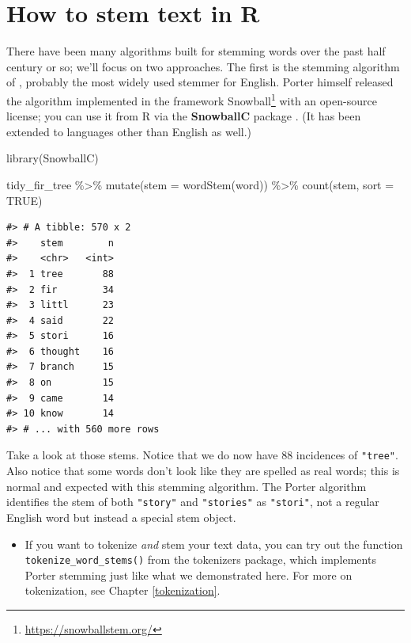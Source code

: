 \documentclass[
]{krantz}
\makeatletter
\newenvironment{Shaded}{\begin{snugshade}}{\end{snugshade}}
\newcommand{\AttributeTok}[1]{\textcolor[rgb]{0.77,0.63,0.00}{#1}}
\newcommand{\ConstantTok}[1]{\textcolor[rgb]{0.00,0.00,0.00}{#1}}
\newcommand{\FunctionTok}[1]{\textcolor[rgb]{0.00,0.00,0.00}{#1}}
\newcommand{\NormalTok}[1]{#1}
\newcommand{\SpecialCharTok}[1]{\textcolor[rgb]{0.00,0.00,0.00}{#1}}
\DeclareRobustCommand{\href}[2]{#2\footnote{\url{#1}}}
\renewcommand{\href}[2]{#2\footnote{\url{#1}}}
\newenvironment{kframe}{%
\medskip{}
\setlength{\fboxsep}{.8em}
 \def\at@end@of@kframe{}%
 \ifinner\ifhmode%
  \def\at@end@of@kframe{\end{minipage}}%
  \begin{minipage}{\columnwidth}%
 \fi\fi%
 \def\FrameCommand##1{\hskip\@totalleftmargin \hskip-\fboxsep
 \colorbox{shadecolor}{##1}\hskip-\fboxsep
     \hskip-\linewidth \hskip-\@totalleftmargin \hskip\columnwidth}%
 \MakeFramed {\advance\hsize-\width
   \@totalleftmargin\z@ \linewidth\hsize
   \@setminipage}}%
 {\par\unskip\endMakeFramed%
 \at@end@of@kframe}
\renewenvironment{Shaded}{\begin{kframe}}{\end{kframe}}
\newenvironment{rmdblock}[1]
  {\begin{shaded*}
  \begin{itemize}[left = -1cm, labelsep = 1cm]
  \renewcommand{\labelitemi}{
    \raisebox{-.7\height}[0pt][0pt]{
      {\setkeys{Gin}{width=3em,keepaspectratio}\texttt{[image: images/\#1]}}
    }
  }
 
  \item
  }
  {
  \end{itemize}
  \end{shaded*}
  }
\newenvironment{rmdnote}
  {\begin{rmdblock}{note}}
  {\end{rmdblock}}
\makeatother
\begin{document}
\hypertarget{how-to-stem-text-in-r}{%
\section{How to stem text in R}\label{how-to-stem-text-in-r}}

There have been many algorithms built for stemming words over the past half century or so; we'll focus on two approaches. The first is the stemming algorithm of \citet{Porter80}, probably the most widely used stemmer for English. Porter himself released the algorithm implemented in the framework \href{https://snowballstem.org/}{Snowball} with an open-source license; you can use it from R via the \textbf{SnowballC} package \citep{R-SnowballC}. (It has been extended to languages other than English as well.)

\begin{Shaded}
\begin{Highlighting}[]
\FunctionTok{library}\NormalTok{(SnowballC)}

\NormalTok{tidy\_fir\_tree }\SpecialCharTok{\%\textgreater{}\%}
  \FunctionTok{mutate}\NormalTok{(}\AttributeTok{stem =} \FunctionTok{wordStem}\NormalTok{(word)) }\SpecialCharTok{\%\textgreater{}\%}
  \FunctionTok{count}\NormalTok{(stem, }\AttributeTok{sort =} \ConstantTok{TRUE}\NormalTok{)}
\end{Highlighting}
\end{Shaded}

\begin{verbatim}
#> # A tibble: 570 x 2
#>    stem        n
#>    <chr>   <int>
#>  1 tree       88
#>  2 fir        34
#>  3 littl      23
#>  4 said       22
#>  5 stori      16
#>  6 thought    16
#>  7 branch     15
#>  8 on         15
#>  9 came       14
#> 10 know       14
#> # ... with 560 more rows
\end{verbatim}

Take a look at those stems. Notice that we do now have 88 incidences of \texttt{"tree"}. Also notice that some words don't look like they are spelled as real words; this is normal and expected with this stemming algorithm. The Porter algorithm identifies the stem of both \texttt{"story"} and \texttt{"stories"} as \texttt{"stori"}, not a regular English word but instead a special stem object.

\begin{rmdnote}
If you want to tokenize \emph{and} stem your text data, you can try out the function \texttt{tokenize\_word\_stems()} from the tokenizers package, which implements Porter stemming just like what we demonstrated here. For more on tokenization, see Chapter \ref{tokenization}.
\end{rmdnote}
\end{document}
